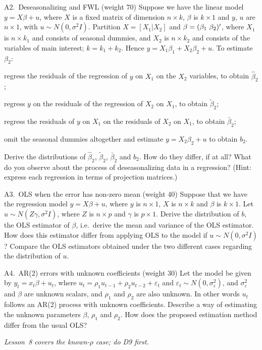 \documentclass[11pt]{article}
\newcommand{\examtag}[1]{\tcbox[on line, colback=examred, colframe=examred, coltext=white,
  boxsep=1pt, left=3pt, right=3pt, top=0pt, bottom=0pt, arc=1.5pt]{\scriptsize\sffamily\bfseries EXAM #1}}
\begin{document}
\begin{qbox}{A2.\ Deseasonalizing and FWL \quad(weight 70)}{\examtag{F2024 Q3}}
Suppose we have the linear model $y = X\beta + u$, where $X$ is a fixed matrix of
dimension $n \times k$, $\beta$ is $k \times 1$ and $y$, $u$ are $n \times 1$,
with $u \sim N(0,\sigma^{2}I)$. Partition $X = [X_{1}|X_{2}]$ and
$\beta = (\beta_{1}\ \beta_{2})\xT$, where $X_{1}$ is $n \times k_{1}$ and
consists of seasonal dummies, and $X_{2}$ is $n \times k_{2}$ and consists of
the variables of main interest; $k = k_{1} + k_{2}$. Hence
$y = X_{1}\beta_{1} + X_{2}\beta_{2} + u$. To estimate $\beta_{2}$:
\begin{flatlist}
  \item[(i)] regress the residuals of the regression of $y$ on $X_{1}$ on the
        $X_{2}$ variables, to obtain $\hat\beta_{2}$;
  \item[(ii)] regress $y$ on the residuals of the regression of $X_{2}$ on
        $X_{1}$, to obtain $\tilde\beta_{2}$;
  \item[(iii)] regress the residuals of $y$ on $X_{1}$ on the residuals of $X_{2}$
        on $X_{1}$, to obtain $\bar\beta_{2}$;
  \item[(iv)] omit the seasonal dummies altogether and estimate
        $y = X_{2}\beta_{2} + u$ to obtain $b_{2}$.
\end{flatlist}
Derive the distributions of $\hat\beta_{2}$, $\tilde\beta_{2}$, $\bar\beta_{2}$
and $b_{2}$. How do they differ, if at all? What do you observe about the
process of deseasonalizing data in a regression? (Hint: express each regression
in terms of projection matrices.)
\end{qbox}

\begin{qbox}{A3.\ OLS when the error has non-zero mean \quad(weight 40)}{\examtag{F2023 Q3}}
Suppose that we have the regression model $y = X\beta + u$, where $y$ is $n \times 1$,
$X$ is $n \times k$ and $\beta$ is $k \times 1$. Let $u \sim N(Z\gamma, \sigma^{2}I)$,
where $Z$ is $n \times p$ and $\gamma$ is $p \times 1$. Derive the distribution of $b$,
the OLS estimator of $\beta$, i.e.\ derive the mean and variance of the OLS estimator.
How does this estimator differ from applying OLS to the model if
$u \sim N(0,\sigma^{2}I)$? Compare the OLS estimators obtained under the two different
cases regarding the distribution of $u$.
\end{qbox}

\begin{qbox}{A4.\ AR(2) errors with unknown coefficients \quad(weight 30)}{\examtag{F2023 Q1}}
Let the model be given by $y_{t} = x_{t}\beta + u_{t}$, where
$u_{t} = \rho_{1}u_{t-1} + \rho_{2}u_{t-2} + \varepsilon_{t}$ and
$\varepsilon_{t} \sim N(0,\sigma_{\varepsilon}^{2})$, and $\sigma_{\varepsilon}^{2}$ and
$\beta$ are unknown scalars, and $\rho_{1}$ and $\rho_{2}$ are also unknown. In other
words $u_{t}$ follows an AR(2) process with unknown coefficients. Describe a way of
estimating the unknown parameters $\beta$, $\rho_{1}$ and $\rho_{2}$. How does the
proposed estimation method differ from the usual OLS?
\par\smallskip
{\small\emph{Lesson~8 covers the known-$\rho$ case; do D9 first.}}
\end{qbox}
\end{document}
